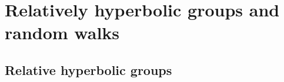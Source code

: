\documentclass{amsart}
\newcommand{\showcomments}{yes}
\newenvironment{comment}%
{\ifthenelse{\equal{\showcomments}{yes}}%
{\footnotemark
    \begin{lrbox}{\commentbox}
    \begin{minipage}[t]{1.25in}\raggedright\sffamily\upshape\tiny
    \footnotemark[\arabic{footnote}]}%
{\begin{lrbox}{\commentbox}}}%
{\ifthenelse{\equal{\showcomments}{yes}}%
{\end{minipage}\end{lrbox}\marginpar{\usebox{\commentbox}}}%
{\end{lrbox}}}
\theoremstyle{definition}
\theoremstyle{remark}
\begin{document}
\section{Relatively hyperbolic groups and random walks}\label{sectionrelativelyhyperbolicgroups}
\subsection{Relative hyperbolic groups} %
\end{document}
